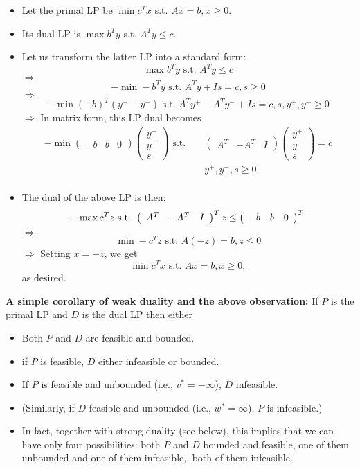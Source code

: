 \documentclass{article}
\begin{document}
\begin{itemize}
\item Let the primal LP be $\min c^Tx$ s.t. $Ax=b, x\ge 0$.
\item Its dual LP is $\max b^Ty$ s.t. $A^Ty\leq c$.
\item Let us transform the latter LP into a standard form:
\[
\max b^Ty \text{ s.t. } A^Ty \le c
\]
$\Rightarrow$
\[
- \min -b^Ty \text{ s.t. } A^Ty + I s = c, s\geq 0
\]
$\Rightarrow$
\[
- \min (-b)^T(y^+-y^-) \text{ s.t. } A^Ty^+- A^Ty^-+ I s = c, s, y^+, y^-\geq 0
\]
$\Rightarrow$ In matrix form, this LP dual becomes
\begin{eqnarray*}
-\min
\left(
\begin{array}{ccc}
-b&b&0
\end{array}
\right)
\left(
\begin{array}{c}
y^+\\y^-\\s
\end{array}
\right) \text{ s.t. }
&&\left(\begin{array}{ccc}
A^T&-A^T&I
\end{array}
\right)
\left(\begin{array}{c}
y^+\\
y^-\\
s
\end{array}
\right) = c\\
&&y^+,y^-,s \ge 0\\
\end{eqnarray*}
\item The dual of the above LP is then:
\[
-\max c^T z \text{ s.t. }  \left(\begin{array}{ccc}
A^T&-A^T&I
\end{array}
\right)^T z
\le
\left(
\begin{array}{ccc}
-b&b&0
\end{array}
\right)^T\\
\]
$\Rightarrow$ 
\[
\min -c^T z \text{ s.t. }  A(-z)=b, z\leq 0
\]
$\Rightarrow$ Setting $x=-z$, we get
\[
\min c^T x \text{ s.t. }  Ax=b, x\geq 0,
\]
as desired.
\end{itemize}

{\bf A simple corollary of weak duality and the above observation:}  If $P$ is the primal LP and $D$ is the dual LP then either
\begin{itemize}
\item Both $P$ and $D$ are feasible and bounded. 
\item if $P$ is feasible, $D$ either infeasible or bounded.
\item If $P$ is feasible and unbounded (i.e., $v^*=-\infty$), $D$ infeasible.
\item (Similarly, if $D$ feasible and unbounded (i.e., $w^*=\infty$), $P$ is infeasible.)  
\item In fact, together with strong duality (see below), this implies that we can have only four possibilities: both $P$ and $D$ bounded and feasible, one of them unbounded and one of them infeasible,, both of them infeasible.
\end{itemize}
\end{document}
